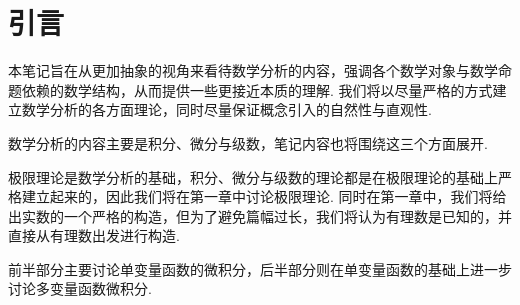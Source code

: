 \documentclass[../main.tex]{subfiles}
\begin{document}
\chapter*{引言}

本笔记旨在从更加抽象的视角来看待数学分析的内容，强调各个数学对象与数学命题依赖的数学结构，从而提供一些更接近本质的理解. 我们将以尽量严格的方式建立数学分析的各方面理论，同时尽量保证概念引入的自然性与直观性. 

数学分析的内容主要是积分、微分与级数，笔记内容也将围绕这三个方面展开. 

极限理论是数学分析的基础，积分、微分与级数的理论都是在极限理论的基础上严格建立起来的，因此我们将在第一章中讨论极限理论. 同时在第一章中，我们将给出实数的一个严格的构造，但为了避免篇幅过长，我们将认为有理数是已知的，并直接从有理数出发进行构造. 

前半部分主要讨论单变量函数的微积分，后半部分则在单变量函数的基础上进一步讨论多变量函数微积分. 
\end{document}
